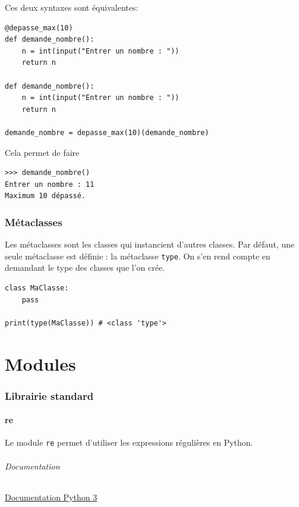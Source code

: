 \documentclass[a4paper, french, 10pt]{article}
\newcommand{\code}[1]{{\small\texttt{#1}}}
\begin{document}
Ces deux syntaxes sont équivalentes:

\begin{verbatim}
@depasse_max(10)
def demande_nombre():
    n = int(input("Entrer un nombre : "))
    return n

def demande_nombre():
    n = int(input("Entrer un nombre : "))
    return n

demande_nombre = depasse_max(10)(demande_nombre)
\end{verbatim}

Cela permet de faire

\begin{Verbatim}[frame = single, fontsize = \footnotesize]
>>> demande_nombre()
Entrer un nombre : 11
Maximum 10 dépassé.
\end{Verbatim}

\section{Métaclasses}\label{sec:metaclasses}
Les métaclasses sont les classes qui instancient d'autres classes. Par défaut, une seule métaclasse est définie : la métaclasse \code{type}. On s'en rend compte en demandant le type des classes que l'on crée.

\begin{verbatim}
class MaClasse:
    pass

print(type(MaClasse)) # <class 'type'>
\end{verbatim}

\setcounter{section}{0}

\newpage
\part{Modules}
\section{Librairie standard}

\subsection{re}
Le module \code{re} permet d'utiliser les expressions régulières en Python.
\paragraph{Documentation} \href{https://docs.python.org/fr/3/library/re.html}{Documentation Python 3}
\end{document}
